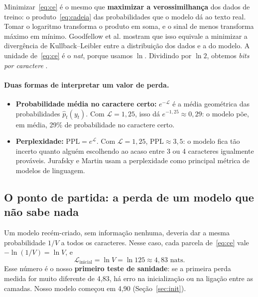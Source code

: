 \documentclass[11pt,a4paper]{article}
\begin{document}
\begin{teoria}
Minimizar~\eqref{eq:ce} é o mesmo que \textbf{maximizar a verossimilhança} dos dados de treino: o produto~\eqref{eq:cadeia} das probabilidades que o modelo dá ao texto real. Tomar o logaritmo transforma o produto em soma, e o sinal de menos transforma máximo em mínimo. Goodfellow et al. \cite[seção~5.5]{goodfellow} mostram que isso equivale a minimizar a divergência de Kullback--Leibler entre a distribuição dos dados e a do modelo. A unidade de~\eqref{eq:ce} é o \emph{nat}, porque usamos $\ln$. Dividindo por $\ln 2$, obtemos \emph{bits por caractere} \cite[cap.~2]{cover}.
\end{teoria}

\paragraph{Duas formas de interpretar um valor de perda.}
\begin{itemize}
\item \textbf{Probabilidade média no caractere certo:} $e^{-\mathcal{L}}$ é a média geométrica das probabilidades $\hat p_t(y_t)$. Com $\mathcal{L}=1{,}25$, isso dá $e^{-1{,}25}\approx 0{,}29$: o modelo põe, em média, 29\% de probabilidade no caractere certo.
\item \textbf{Perplexidade:} $\mathrm{PPL} = e^{\mathcal{L}}$. Com $\mathcal{L}=1{,}25$, $\mathrm{PPL}\approx 3{,}5$: o modelo fica tão incerto quanto alguém escolhendo ao acaso entre 3 ou 4 caracteres igualmente prováveis. Jurafsky e Martin \cite[cap.~3]{jurafsky} usam a perplexidade como principal métrica de modelos de linguagem.
\end{itemize}

\subsection{O ponto de partida: a perda de um modelo que não sabe nada}
\label{sec:lnv}

Um modelo recém-criado, sem informação nenhuma, deveria dar a mesma probabilidade $1/V$ a todos os caracteres. Nesse caso, cada parcela de~\eqref{eq:ce} vale $-\ln(1/V) = \ln V$, e
\[
\mathcal{L}_{\text{inicial}} = \ln V = \ln 125 \approx 4{,}83 \text{ nats}.
\]
Esse número é o nosso \textbf{primeiro teste de sanidade}: se a primeira perda medida for muito diferente de 4,83, há erro na inicialização ou na ligação entre as camadas. Nosso modelo começou em 4,90 (Seção~\ref{sec:init}).
\end{document}

